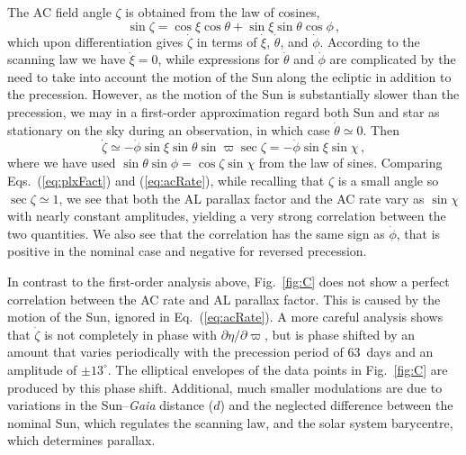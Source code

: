 \documentclass[longauth]{aa} %
\begin{document}
The AC field angle $\zeta$ is obtained from the law of cosines, 
\begin{equation}\label{eq:zeta}
\sin\zeta = \cos\xi\cos\theta+\sin\xi\sin\theta\cos\phi \, ,
\end{equation}
which upon differentiation gives $\dot{\zeta}$ in terms of $\dot{\xi}$, $\dot{\theta}$, 
and $\dot{\phi}$. According to the scanning law we have $\dot{\xi}=0$, while expressions 
for $\dot{\theta}$ and $\dot{\phi}$ are complicated by the need to take into account the 
motion of the Sun along the ecliptic in addition to the precession. However, as the motion 
of the Sun is substantially slower than the precession, we may in a first-order approximation 
regard both Sun and star as stationary on the sky during an observation, in which case 
$\dot{\theta}\simeq 0$. Then 
\begin{equation}\label{eq:acRate}
\dot{\zeta} \simeq -\dot{\phi}\sin\xi\sin\theta\sin\varpi\sec\zeta
= -\dot{\phi}\sin\xi\sin\chi \, ,
\end{equation}
where we have used $\sin\theta\sin\phi=\cos\zeta\sin\chi$ from the law of sines. 
Comparing Eqs.~(\ref{eq:plxFact}) and (\ref{eq:acRate}), while recalling that $\zeta$ is
a small angle so $\sec\zeta\simeq 1$, we see that both the AL parallax factor and the 
AC rate vary as $\sin\chi$ with nearly constant amplitudes, yielding a very strong  
correlation between the two quantities. We also see that the correlation 
has the same sign as $\dot{\phi}$, that is positive in the nominal case and negative 
for reversed precession.

In contrast to the first-order analysis above, Fig.~\ref{fig:C} does not show a perfect
correlation between the AC rate and AL parallax factor. This is caused by the motion of
the Sun, ignored in Eq.~(\ref{eq:acRate}). A more careful analysis shows that $\dot{\zeta}$ 
is not completely in phase with $\partial\eta/\partial\varpi$, but is phase shifted 
by an amount that varies periodically with the precession period of 63~days and an 
amplitude of $\pm 13^\circ$. The elliptical envelopes of the data points in Fig.~\ref{fig:C} 
are produced by this phase shift. Additional, much smaller modulations are due to
variations in the Sun--\textit{Gaia} distance ($d$) and the neglected difference
between the nominal Sun, which regulates the scanning law, and the solar system 
barycentre, which determines parallax.
\end{document}
